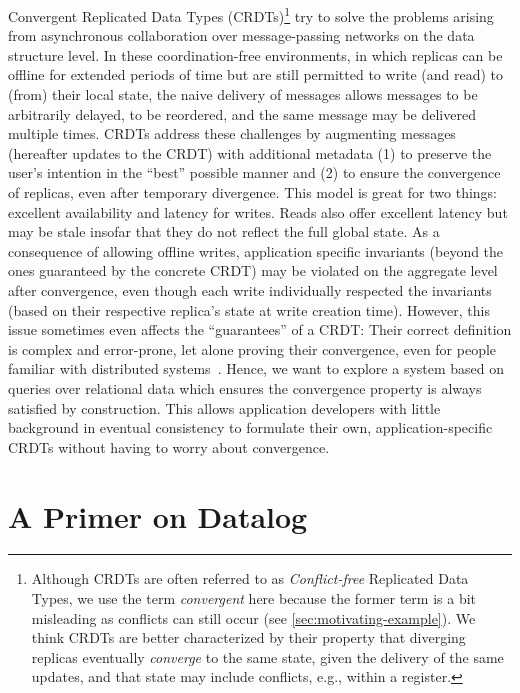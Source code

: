 \documentclass{article}
\begin{document}
Convergent Replicated Data Types (CRDTs)\footnote{
    Although CRDTs are often referred to as \emph{Conflict-free} Replicated
    Data Types, we use the term \emph{convergent} here because the former term
    is a bit misleading as conflicts can still occur
    (see \autoref{sec:motivating-example}).
    We think CRDTs are better characterized by their property that diverging
    replicas eventually \emph{converge} to the same state,
    given the delivery of the same updates,
    and that state may include conflicts, e.g., within a register.
} try to solve the problems arising from asynchronous collaboration over
message-passing networks on the data structure level.
In these coordination-free environments, in which replicas can be offline
for extended periods of time but are still permitted to write (and read)
to (from) their local state,
the naive delivery of messages allows messages to be arbitrarily delayed,
to be reordered, and the same message may be delivered multiple times.
CRDTs address these challenges by augmenting messages (hereafter updates
to the CRDT) with additional metadata (1) to preserve the user's intention
in the ``best'' possible manner and (2) to ensure the convergence of replicas,
even after temporary divergence.
This model is great for two things: excellent availability and latency for writes.
Reads also offer excellent latency but may be stale insofar that they do not
reflect the full global state.
As a consequence of allowing offline writes,
application specific invariants (beyond the ones guaranteed by the concrete CRDT)
may be violated on the aggregate level after convergence,
even though each write individually respected the invariants (based on their
respective replica's state at write creation time).
However, this issue sometimes even affects the ``guarantees'' of a CRDT:
Their correct definition is complex and error-prone,
let alone proving their convergence, even for people familiar with distributed
systems~\cite{kleppmann2022assessing, gomes2017verifying}.
Hence, we want to explore a system based on queries over relational data
which ensures the convergence property is always satisfied by construction.
This allows application developers with little background in eventual
consistency to formulate their own, application-specific CRDTs without
having to worry about convergence.

\section{A Primer on Datalog}
\label{sec:datalog-primer}
\end{document}
